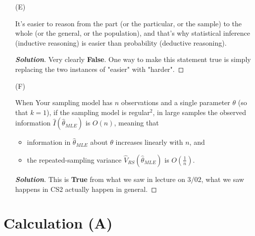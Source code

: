 \documentclass[12pt]{article}
\newcommand{\lrp}[1]{\left(#1\right)}
\newenvironment{solution}{\begin{tcolorbox}[breakable]\begin{proof}[\textbf{\textit{Solution}}] }{\end{proof}\end{tcolorbox}}
\begin{document}
\begin{itemize}
\begin{solution}
    This is \textbf{False} based on what we learned in class on 3/03. To make it true we simply have to change the bias of $\hat{\theta}_{MLE}$ to $O \lrp{\dfrac{1}{n}}$, NOT $O \lrp{\dfrac{1}{n^{2}}}$
\end{solution}

\item[(E)]

It's easier to reason from the part (or the particular, or the sample) to
the whole (or the general, or the population), and that's why statistical
inference (inductive reasoning) is easier than probability (deductive
reasoning). 

\begin{solution}
    Very clearly \textbf{False}. One way to make this statement true is simply replacing the two instances of "easier" with "harder". 
\end{solution}

\item[(F)]

When Your sampling model has $n$ observations and a single parameter $\theta$ (so that $k = 1$), if the sampling model is regular$^2$, in large samples the observed information $\hat{ I } \! \left( \hat{ \theta }_{ MLE } \right)$ is $O ( n )$, meaning that 
\begin{itemize}

\item

information in $\hat{ \theta }_{ MLE }$ about $\theta$ increases linearly with $n$, and

\item

the repeated-sampling variance $\hat{ V }_{ RS } \! \left( \hat{ \theta }_{ MLE } \right)$ is $O \! \left( \frac{ 1 }{ n } \right)$.

\end{itemize}

\begin{solution}
    This is \textbf{True} from what we saw in lecture on $3/02$, what we saw happens in CS2 actually happen in general.
\end{solution}

\end{itemize}

\section{Calculation (A)}
\end{document}
